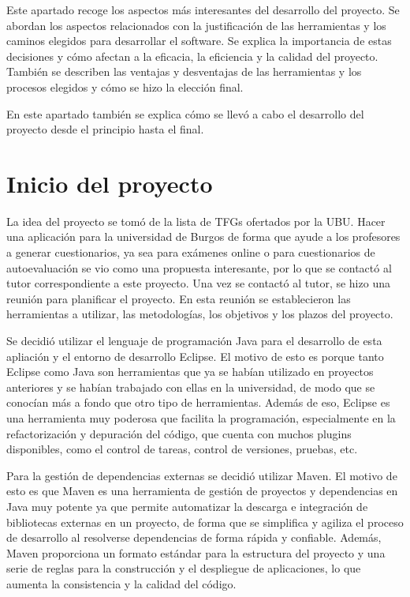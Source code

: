 
Este apartado recoge los aspectos más interesantes del desarrollo del proyecto. Se abordan los aspectos relacionados con la justificación de las herramientas y los caminos elegidos para desarrollar el software. Se explica la importancia de estas decisiones y cómo afectan a la eficacia, la eficiencia y la calidad del proyecto. También se describen las ventajas y desventajas de las herramientas y los procesos elegidos y cómo se hizo la elección final.

En este apartado también se explica cómo se llevó a cabo el desarrollo del proyecto desde el principio hasta el final.

\section{Inicio del proyecto}
La idea del proyecto se tomó de la lista de TFGs ofertados por la UBU. Hacer una aplicación para la universidad de Burgos de forma que ayude a los profesores a generar cuestionarios, ya sea para exámenes online o para cuestionarios de autoevaluación se vio como una propuesta interesante, por lo que se contactó al tutor correspondiente a este proyecto. Una vez se contactó al tutor, se hizo una reunión para planificar el proyecto. En esta reunión se establecieron las herramientas a utilizar, las metodologías, los objetivos y los plazos del proyecto.

Se decidió utilizar el lenguaje de programación Java para el desarrollo de esta apliación y el entorno de desarrollo Eclipse. El motivo de esto es porque tanto Eclipse como Java son herramientas que ya se habían utilizado en proyectos anteriores y se habían trabajado con ellas en la universidad, de modo que se conocían más a fondo que otro tipo de herramientas. Además de eso, Eclipse es una herramienta muy poderosa que facilita la programación, especialmente en la refactorización y depuración del código, que cuenta con muchos plugins disponibles, como el control de tareas, control de versiones, pruebas, etc.

Para la gestión de dependencias externas se decidió utilizar Maven. El motivo de esto es que Maven es una herramienta de gestión de proyectos y dependencias en Java muy potente ya que permite automatizar la descarga e integración de bibliotecas externas en un proyecto, de forma que se simplifica y agiliza el proceso de desarrollo al resolverse dependencias de forma rápida y confiable. Además, Maven proporciona un formato estándar para la estructura del proyecto y una serie de reglas para la construcción y el despliegue de aplicaciones, lo que aumenta la consistencia y la calidad del código.

